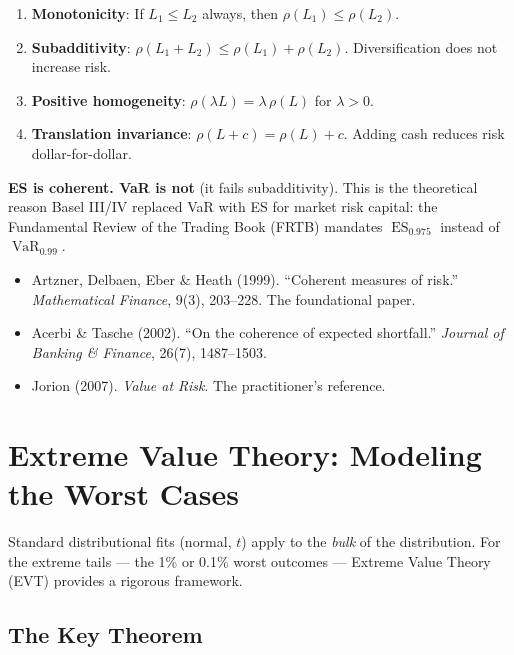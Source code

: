 \documentclass[11pt, a4paper]{article}
\theoremstyle{definition}
\theoremstyle{plain}
\theoremstyle{remark}
\newcommand{\VaR}{\operatorname{VaR}}
\newcommand{\ES}{\operatorname{ES}}
\begin{document}
\begin{enumerate}
    \item \textbf{Monotonicity}: If $L_1 \leq L_2$ always, then $\rho(L_1) \leq \rho(L_2)$.
    \item \textbf{Subadditivity}: $\rho(L_1 + L_2) \leq \rho(L_1) + \rho(L_2)$. Diversification does not increase risk.
    \item \textbf{Positive homogeneity}: $\rho(\lambda L) = \lambda \, \rho(L)$ for $\lambda > 0$.
    \item \textbf{Translation invariance}: $\rho(L + c) = \rho(L) + c$. Adding cash reduces risk dollar-for-dollar.
\end{enumerate}

\begin{keyresult}
\textbf{ES is coherent. VaR is not} (it fails subadditivity).
This is the theoretical reason Basel III/IV replaced VaR with ES for market risk capital:
the Fundamental Review of the Trading Book (FRTB) mandates $\ES_{0.975}$ instead of $\VaR_{0.99}$.
\end{keyresult}

\begin{refbox}
\begin{itemize}
    \item Artzner, Delbaen, Eber \& Heath (1999). ``Coherent measures of risk.'' \emph{Mathematical Finance}, 9(3), 203--228. The foundational paper.
    \item Acerbi \& Tasche (2002). ``On the coherence of expected shortfall.'' \emph{Journal of Banking \& Finance}, 26(7), 1487--1503.
    \item Jorion (2007). \emph{Value at Risk}. The practitioner's reference.
\end{itemize}
\end{refbox}

\section{Extreme Value Theory: Modeling the Worst Cases}
\label{sec:evt}

Standard distributional fits (normal, $t$) apply to the \emph{bulk} of the distribution.
For the extreme tails --- the 1\% or 0.1\% worst outcomes --- Extreme Value Theory (EVT) provides a rigorous framework.

\subsection{The Key Theorem}
\end{document}

